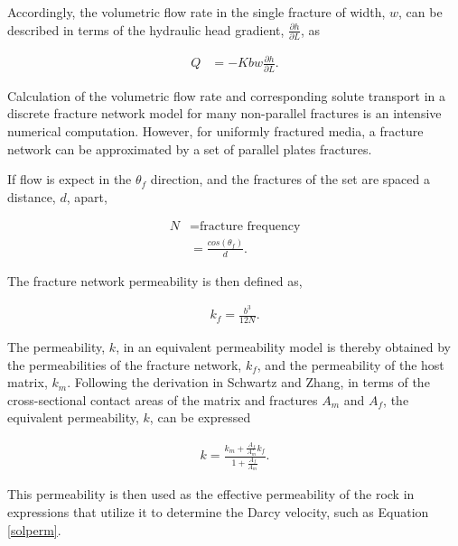 Accordingly, the volumetric flow rate in the single fracture of width, $w$, can
be described in terms of the hydraulic head gradient, $\frac{\partial
h}{\partial L}$, as

\begin{align} 
  Q & = -Kbw\frac{\partial h}{\partial L}.
  \label{Qplates}
\end{align}

Calculation of the volumetric flow rate and corresponding solute transport in a
discrete fracture network model for many non-parallel fractures is an intensive
numerical computation. However, for uniformly fractured media, a fracture
network can be approximated by a set of parallel plates fractures. 

If flow is expect in the $\theta_f$ direction, and the fractures of the set are
spaced a distance, $d$, apart,

\begin{align} 
  N &= \mbox{fracture frequency}\nonumber\\ 
  &= \frac{cos(\theta_f)}{d}.  
  \label{fracfreq} 
\end{align}

The fracture network permeability is then defined as, 

\begin{align} 
  k_f =
\frac{b^3}{12N}.  
\label{fracperm} 
\end{align}

The permeability, $k$, in an equivalent permeability model is thereby obtained
by the permeabilities of the fracture network, $k_f$, and the permeability of
the host matrix, $k_m$. Following the derivation in Schwartz and Zhang, in
terms of the cross-sectional contact areas of the matrix and fractures $A_m$
and $A_f$, the equivalent permeability, $k$, can be expressed

\begin{align} 
  k = \frac{k_m + \frac{A_f}{A_m}k_f}{1+\frac{A_f}{A_m}}.
  \label{equivperm} 
\end{align}

This permeability is then used as the effective permeability of the rock in 
expressions that utilize it to determine the Darcy velocity, such as Equation 
\eqref{solperm}.




